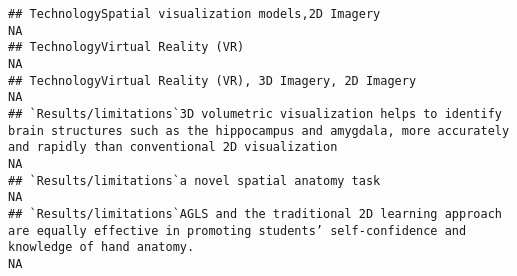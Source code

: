 \documentclass[]{article}
\begin{document}
\begin{verbatim}
## TechnologySpatial visualization models,2D Imagery                                                                                                                                                                                                                                                                                                                                                                                                                                     NA
## TechnologyVirtual Reality (VR)                                                                                                                                                                                                                                                                                                                                                                                                                                                        NA
## TechnologyVirtual Reality (VR), 3D Imagery, 2D Imagery                                                                                                                                                                                                                                                                                                                                                                                                                                NA
## `Results/limitations`3D volumetric visualization helps to identify brain structures such as the hippocampus and amygdala, more accurately and rapidly than conventional 2D visualization                                                                                                                                                                                                                                                                                              NA
## `Results/limitations`a novel spatial anatomy task                                                                                                                                                                                                                                                                                                                                                                                                                                     NA
## `Results/limitations`AGLS and the traditional 2D learning approach are equally effective in promoting students’ self-confidence and knowledge of hand anatomy.                                                                                                                                                                                                                                                                                                                        NA

\end{verbatim}
\end{document}
